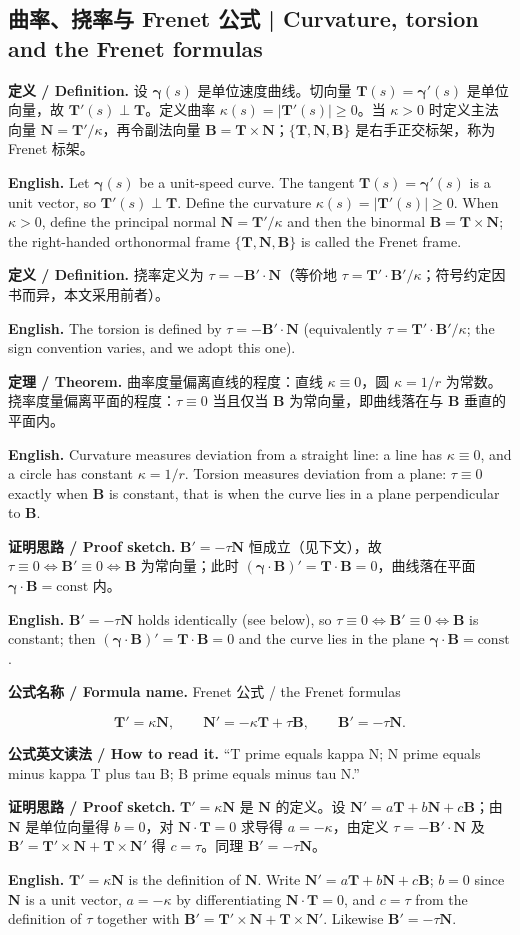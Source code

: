 \documentclass[UTF8,11pt,a4paper]{ctexart}
\newcommand{\EN}[1]{\par\noindent \textbf{English.} #1\par}
\newcommand{\FORMULA}[2]{\par\noindent\textbf{公式名称 / Formula name.} #1 / #2\par}
\newcommand{\READ}[1]{\par\noindent \textbf{公式英文读法 / How to read it.} #1\par}
\newcommand{\DEF}[2]{\par\noindent\textbf{定义 / Definition.} #1\par\EN{#2}\par\smallskip}
\newcommand{\THM}[2]{\par\noindent\textbf{定理 / Theorem.} #1\par\EN{#2}\par\smallskip}
\newcommand{\PROOF}[2]{\par\noindent\textbf{证明思路 / Proof sketch.} #1\par\EN{#2}\par\smallskip}
\newcommand{\bT}{\mathbf{T}}
\newcommand{\bN}{\mathbf{N}}
\newcommand{\bB}{\mathbf{B}}
\newcommand{\bgamma}{\boldsymbol{\gamma}}
\begin{document}
\subsection{曲率、挠率与 Frenet 公式 | Curvature, torsion and the Frenet formulas}
\DEF{设 $\bgamma(s)$ 是单位速度曲线。切向量 $\bT(s)=\bgamma'(s)$ 是单位向量，故 $\bT'(s)\perp\bT$。定义曲率 $\kappa(s)=|\bT'(s)|\ge0$。当 $\kappa>0$ 时定义主法向量 $\bN=\bT'/\kappa$，再令副法向量 $\bB=\bT\times\bN$；$\{\bT,\bN,\bB\}$ 是右手正交标架，称为 Frenet 标架。}{Let $\bgamma(s)$ be a unit-speed curve. The tangent $\bT(s)=\bgamma'(s)$ is a unit vector, so $\bT'(s)\perp\bT$. Define the curvature $\kappa(s)=|\bT'(s)|\ge0$. When $\kappa>0$, define the principal normal $\bN=\bT'/\kappa$ and then the binormal $\bB=\bT\times\bN$; the right-handed orthonormal frame $\{\bT,\bN,\bB\}$ is called the Frenet frame.}
\DEF{挠率定义为 $\tau=-\bB'\cdot\bN$（等价地 $\tau=\bT'\cdot\bB'/\kappa$；符号约定因书而异，本文采用前者）。}{The torsion is defined by $\tau=-\bB'\cdot\bN$ (equivalently $\tau=\bT'\cdot\bB'/\kappa$; the sign convention varies, and we adopt this one).}
\THM{曲率度量偏离直线的程度：直线 $\kappa\equiv0$，圆 $\kappa=1/r$ 为常数。挠率度量偏离平面的程度：$\tau\equiv0$ 当且仅当 $\bB$ 为常向量，即曲线落在与 $\bB$ 垂直的平面内。}{Curvature measures deviation from a straight line: a line has $\kappa\equiv0$, and a circle has constant $\kappa=1/r$. Torsion measures deviation from a plane: $\tau\equiv0$ exactly when $\bB$ is constant, that is when the curve lies in a plane perpendicular to $\bB$.}
\PROOF{$\bB'=-\tau\bN$ 恒成立（见下文），故 $\tau\equiv0\iff\bB'\equiv0\iff\bB$ 为常向量；此时 $(\bgamma\cdot\bB)'=\bT\cdot\bB=0$，曲线落在平面 $\bgamma\cdot\bB=\text{const}$ 内。}{$\bB'=-\tau\bN$ holds identically (see below), so $\tau\equiv0\iff\bB'\equiv0\iff\bB$ is constant; then $(\bgamma\cdot\bB)'=\bT\cdot\bB=0$ and the curve lies in the plane $\bgamma\cdot\bB=\text{const}$.}
\FORMULA{Frenet 公式}{the Frenet formulas}
\[
\bT'=\kappa\bN,\qquad \bN'=-\kappa\bT+\tau\bB,\qquad \bB'=-\tau\bN .
\]
\READ{``T prime equals kappa N; N prime equals minus kappa T plus tau B; B prime equals minus tau N.''}
\PROOF{$\bT'=\kappa\bN$ 是 $\bN$ 的定义。设 $\bN'=a\bT+b\bN+c\bB$；由 $\bN$ 是单位向量得 $b=0$，对 $\bN\cdot\bT=0$ 求导得 $a=-\kappa$，由定义 $\tau=-\bB'\cdot\bN$ 及 $\bB'=\bT'\times\bN+\bT\times\bN'$ 得 $c=\tau$。同理 $\bB'=-\tau\bN$。}{$\bT'=\kappa\bN$ is the definition of $\bN$. Write $\bN'=a\bT+b\bN+c\bB$; $b=0$ since $\bN$ is a unit vector, $a=-\kappa$ by differentiating $\bN\cdot\bT=0$, and $c=\tau$ from the definition of $\tau$ together with $\bB'=\bT'\times\bN+\bT\times\bN'$. Likewise $\bB'=-\tau\bN$.}
\end{document}
